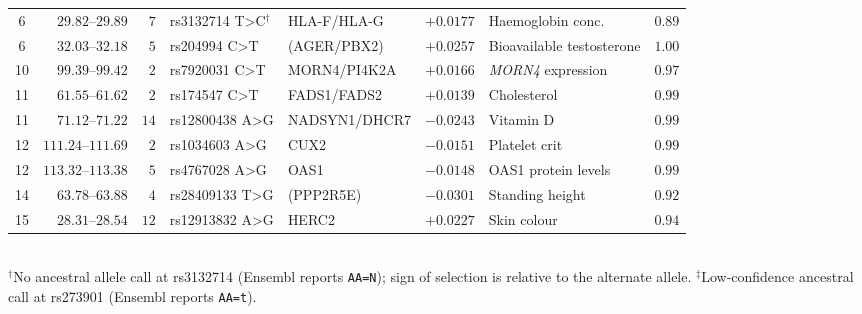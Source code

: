 \documentclass{article}
\begin{document}
\begin{table}[htbp]
{\begin{tabular}{c r r l l r l r}
        6  & $29.82$–$29.89$   & $7$   & rs3132714 T\textgreater C$^\dagger$ & HLA-F/HLA-G & $+0.0177$ & Haemoglobin conc. & $0.89$ \\
        6  & $32.03$–$32.18$   & $5$   & rs204994 C\textgreater T   & (AGER/PBX2)   & $+0.0257$ & Bioavailable testosterone & $1.00$ \\
        10 & $99.39$–$99.42$   & $2$   & rs7920031 C\textgreater T  & MORN4/PI4K2A  & $+0.0166$ & \textit{MORN4} expression & $0.97$ \\
        11 & $61.55$–$61.62$   & $2$   & rs174547 C\textgreater T   & FADS1/FADS2   & $+0.0139$ & Cholesterol           & $0.99$ \\
        11 & $71.12$–$71.22$   & $14$  & rs12800438 A\textgreater G & NADSYN1/DHCR7 & $-0.0243$ & Vitamin D             & $0.99$ \\
        12 & $111.24$–$111.69$ & $2$   & rs1034603 A\textgreater G  & CUX2          & $-0.0151$ & Platelet crit         & $0.99$ \\
        12 & $113.32$–$113.38$ & $5$   & rs4767028 A\textgreater G  & OAS1          & $-0.0148$ & OAS1 protein levels   & $0.99$ \\
        14 & $63.78$–$63.88$   & $4$   & rs28409133 T\textgreater G & (PPP2R5E)     & $-0.0301$ & Standing height       & $0.92$ \\
        15 & $28.31$–$28.54$   & $12$  & rs12913832 A\textgreater G & HERC2         & $+0.0227$ & Skin colour           & $0.94$ \\
        \bottomrule
    \end{tabular}%
    }
    \\[2pt]
    \footnotesize $^{\dagger}$No ancestral allele call at rs3132714 (Ensembl reports \texttt{AA=N}); sign of selection is relative to the alternate allele.
    $^{\ddagger}$Low-confidence ancestral call at rs273901 (Ensembl reports \texttt{AA=t}).
\end{table}
\end{document}
